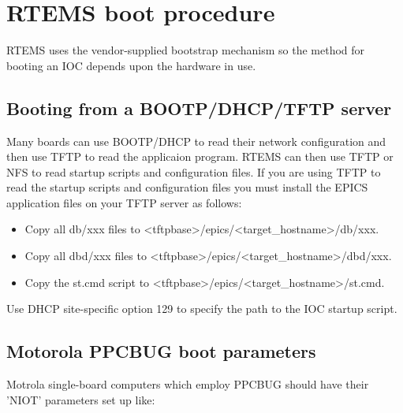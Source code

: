 \section{RTEMS boot procedure}

RTEMS uses the vendor-supplied bootstrap mechanism so the method for booting an IOC depends upon the hardware in 
use.

\subsection{Booting from a BOOTP/DHCP/TFTP server}

Many boards can use BOOTP/DHCP to read their network configuration and then use TFTP to read the applicaion 
program.  RTEMS can then use TFTP or NFS to read startup scripts and configuration files. If you are using TFTP to read 
the startup scripts and configuration files you must install the EPICS application files on your TFTP server as follows:

\begin{itemize}\item Copy all db/xxx files to \textless{}tftpbase\textgreater{}/epics/\textless{}target\_hostname\textgreater{}/db/xxx.

\item Copy all dbd/xxx files to \textless{}tftpbase\textgreater{}/epics/\textless{}target\_hostname\textgreater{}/dbd/xxx.

\item Copy the st.cmd script  to \textless{}tftpbase\textgreater{}/epics/\textless{}target\_hostname\textgreater{}/st.cmd.

\end{itemize}Use DHCP site-specific option 129 to specify the path to the IOC startup script.

\subsection{Motorola PPCBUG boot parameters}

Motrola single-board computers which employ PPCBUG should have their 'NIOT' parameters set up like:

